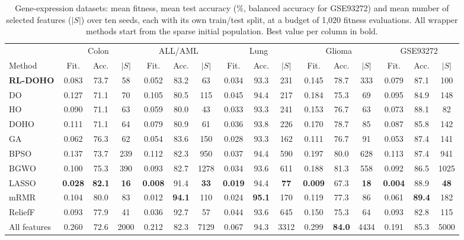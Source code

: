 \documentclass[journal]{IEEEtran}
\begin{document}
\begin{table}[t]
\centering
\caption{Gene-expression datasets: mean fitness, mean test accuracy (\%, balanced accuracy for GSE93272) and mean number of selected features ($|S|$) over ten seeds, each with its own train/test split, at a budget of 1,020 fitness evaluations. All wrapper methods start from the sparse initial population. Best value per column in bold.}
\label{tab:genes}
\footnotesize
\setlength{\tabcolsep}{3.2pt}
\begin{tabular}{@{}l ccc ccc ccc ccc ccc@{}}
\toprule
& \multicolumn{3}{c}{Colon} & \multicolumn{3}{c}{ALL/AML} & \multicolumn{3}{c}{Lung} & \multicolumn{3}{c}{Glioma} & \multicolumn{3}{c}{GSE93272} \\
\cmidrule(lr){2-4}\cmidrule(lr){5-7}\cmidrule(lr){8-10}\cmidrule(lr){11-13}\cmidrule(l){14-16}
Method & Fit. & Acc. & $|S|$ & Fit. & Acc. & $|S|$ & Fit. & Acc. & $|S|$ & Fit. & Acc. & $|S|$ & Fit. & Acc. & $|S|$ \\
\midrule
\textbf{RL-DOHO} & 0.083 & 73.7 & 58 & 0.052 & 83.2 & 63 & 0.034 & 93.3 & 231 & 0.145 & 78.7 & 333 & 0.079 & 87.1 & 100 \\
DO & 0.127 & 71.1 & 70 & 0.105 & 80.5 & 115 & 0.045 & 94.4 & 217 & 0.184 & 75.3 & 69 & 0.095 & 84.9 & 148 \\
HO & 0.090 & 71.1 & 63 & 0.059 & 80.0 & 43 & 0.033 & 93.3 & 241 & 0.153 & 76.7 & 63 & 0.073 & 88.1 & 82 \\
DOHO & 0.111 & 71.1 & 64 & 0.079 & 80.9 & 61 & 0.036 & 93.8 & 226 & 0.170 & 78.7 & 85 & 0.087 & 85.8 & 142 \\
\midrule
GA & 0.062 & 76.3 & 62 & 0.054 & 83.6 & 150 & 0.028 & 93.3 & 162 & 0.111 & 76.7 & 91 & 0.053 & 87.4 & 141 \\
BPSO & 0.137 & 73.7 & 239 & 0.112 & 82.3 & 950 & 0.037 & 94.4 & 590 & 0.197 & 80.0 & 628 & 0.113 & 87.4 & 941 \\
BGWO & 0.100 & 75.3 & 390 & 0.093 & 82.7 & 1278 & 0.034 & 93.6 & 611 & 0.188 & 81.3 & 558 & 0.092 & 86.5 & 1025 \\
\midrule
LASSO & \textbf{0.028} & \textbf{82.1} & \textbf{16} & \textbf{0.008} & 91.4 & \textbf{33} & \textbf{0.019} & 94.4 & \textbf{77} & \textbf{0.009} & 67.3 & \textbf{18} & \textbf{0.004} & 88.9 & \textbf{48} \\
mRMR & 0.104 & 80.0 & 83 & 0.012 & \textbf{94.1} & 110 & 0.024 & \textbf{95.1} & 170 & 0.119 & 77.3 & 86 & 0.061 & \textbf{89.4} & 182 \\
ReliefF & 0.093 & 77.9 & 41 & 0.036 & 92.7 & 57 & 0.044 & 93.6 & 645 & 0.150 & 75.3 & 64 & 0.093 & 82.8 & 115 \\
All features & 0.260 & 72.6 & 2000 & 0.212 & 82.3 & 7129 & 0.067 & 94.3 & 3312 & 0.299 & \textbf{84.0} & 4434 & 0.191 & 85.3 & 5000 \\
\bottomrule
\end{tabular}
\end{table}
\end{document}
